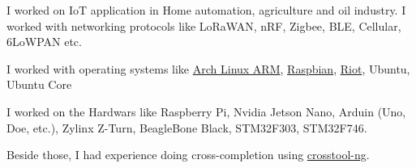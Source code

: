 I worked on IoT application in Home automation, agriculture and oil industry. I worked with networking protocols
like LoRaWAN, nRF, Zigbee, BLE, Cellular, 6LoWPAN etc.

I worked with operating systems like \href{https://archlinuxarm.org/}{Arch Linux ARM}, \href{https://www.raspbian.org/}{Raspbian},
\href{https://www.riot-os.org/}{Riot}, Ubuntu, Ubuntu Core

I worked on the Hardwars like Raspberry Pi, Nvidia Jetson Nano, Arduin (Uno, Doe, etc.), Zylinx Z-Turn, BeagleBone Black,
STM32F303, STM32F746.

Beside those, I had experience doing cross-completion using \href{https://github.com/crosstool-ng/crosstool-ng}{crosstool-ng}.
